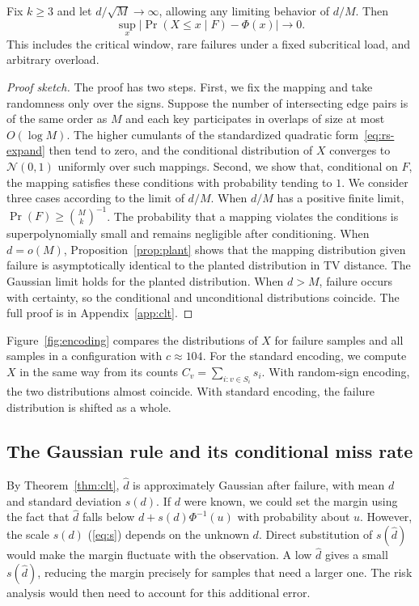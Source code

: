 \begin{theorem}\label{thm:clt}
Fix $k\ge3$ and let $d/\sqrt M\to\infty$, allowing any limiting behavior of $d/M$. Then
\begin{equation}
\sup_x\bigl|\Pr(X\le x\mid F)-\Phi(x)\bigr|\longrightarrow0.\label{eq:clt}
\end{equation}
This includes the critical window, rare failures under a fixed subcritical load, and arbitrary overload.
\end{theorem}

\begin{proof}[Proof sketch]
The proof has two steps. First, we fix the mapping and take randomness only over the signs. Suppose the number of intersecting edge pairs is of the same order as $M$ and each key participates in overlaps of size at most $O(\log M)$. The higher cumulants of the standardized quadratic form~\eqref{eq:rs-expand} then tend to zero, and the conditional distribution of $X$ converges to $\mathcal N(0,1)$ uniformly over such mappings. Second, we show that, conditional on $F$, the mapping satisfies these conditions with probability tending to $1$. We consider three cases according to the limit of $d/M$. When $d/M$ has a positive finite limit, $\Pr(F)\ge\binom Mk^{-1}$. The probability that a mapping violates the conditions is superpolynomially small and remains negligible after conditioning. When $d=o(M)$, Proposition~\ref{prop:plant} shows that the mapping distribution given failure is asymptotically identical to the planted distribution in TV distance. The Gaussian limit holds for the planted distribution. When $d>M$, failure occurs with certainty, so the conditional and unconditional distributions coincide. The full proof is in Appendix~\ref{app:clt}.
\end{proof}

Figure~\ref{fig:encoding} compares the distributions of $X$ for failure samples and all samples in a configuration with $c\approx104$. For the standard encoding, we compute $X$ in the same way from its counts $C_v=\sum_{i:v\in S_i}s_i$. With random-sign encoding, the two distributions almost coincide. With standard encoding, the failure distribution is shifted as a whole.

\subsection{The Gaussian rule and its conditional miss rate}\label{sec:gauss}
By Theorem~\ref{thm:clt}, $\widehat d$ is approximately Gaussian after failure, with mean $d$ and standard deviation $s(d)$. If $d$ were known, we could set the margin using the fact that $\widehat d$ falls below $d+s(d)\Phi^{-1}(u)$ with probability about $u$. However, the scale $s(d)$ (\eqref{eq:s}) depends on the unknown $d$. Direct substitution of $s(\widehat d)$ would make the margin fluctuate with the observation. A low $\widehat d$ gives a small $s(\widehat d)$, reducing the margin precisely for samples that need a larger one. The risk analysis would then need to account for this additional error.

